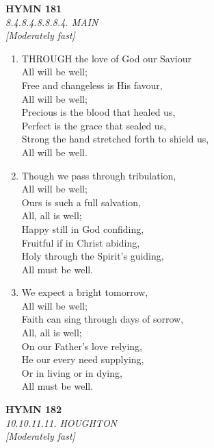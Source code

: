 \documentclass[11pt,a4paper]{article}
\begin{document}
\newpage
\begin{center}
    {\Large \textbf{HYMN 181}}
    \\
    \textit{8.4.8.4.8.8.8.4. MAIN}
    \\
    \textit{\small [Moderately fast]}
\end{center}
\vspace{1em}

\begin{enumerate}
    \item THROUGH the love of God our Saviour \\
        All will be well; \\
        Free and changeless is His favour, \\
        All will be well; \\
        Precious is the blood that healed us, \\
        Perfect is the grace that sealed us, \\
        Strong the hand stretched forth to shield us, \\
        All will be well.

    \item Though we pass through tribulation, \\
        All will be well; \\
        Ours is such a full salvation, \\
        All, all is well; \\
        Happy still in God confiding, \\
        Fruitful if in Christ abiding, \\
        Holy through the Spirit's guiding, \\
        All must be well.

    \item We expect a bright tomorrow, \\
        All will be well; \\
        Faith can sing through days of sorrow, \\
        All, all is well; \\
        On our Father's love relying, \\
        He our every need supplying, \\
        Or in living or in dying, \\
        All must be well.

\end{enumerate}

\newpage
\begin{center}
    {\Large \textbf{HYMN 182}}
    \\
    \textit{10.10.11.11. HOUGHTON}
    \\
    \textit{\small [Moderately fast]}
\end{center}
\vspace{1em}
\end{document}
